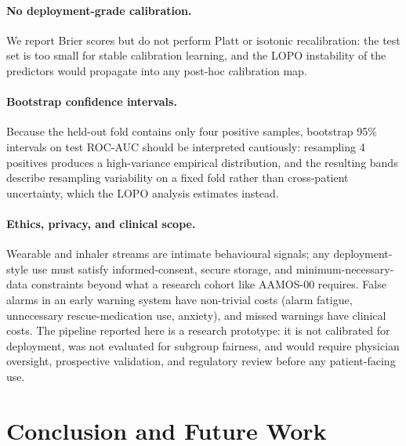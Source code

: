 \documentclass[11pt,a4paper]{article}
\newcommand{\rocauc}{ROC\nobreakdash-AUC}
\begin{document}
\paragraph{No deployment-grade calibration.}
We report Brier scores but do not perform Platt or isotonic
recalibration: the test set is too small for stable calibration
learning, and the LOPO instability of the predictors would
propagate into any post-hoc calibration map.

\paragraph{Bootstrap confidence intervals.}
Because the held-out fold contains only four positive samples,
bootstrap 95\% intervals on test \rocauc{} should be interpreted
cautiously: resampling 4 positives produces a high-variance
empirical distribution, and the resulting bands describe
resampling variability on a fixed fold rather than cross-patient
uncertainty, which the LOPO analysis estimates instead.

\paragraph{Ethics, privacy, and clinical scope.}
Wearable and inhaler streams are intimate behavioural signals;
any deployment-style use must satisfy informed-consent, secure
storage, and minimum-necessary-data constraints beyond what a
research cohort like AAMOS-00 requires.  False alarms in an early
warning system have non-trivial costs (alarm fatigue, unnecessary
rescue-medication use, anxiety), and missed warnings have
clinical costs.  The pipeline reported here is a research
prototype: it is not calibrated for deployment, was not evaluated
for subgroup fairness, and would require physician oversight,
prospective validation, and regulatory review before any
patient-facing use.

\section{Conclusion and Future Work}\label{sec:conclusion}
\end{document}
